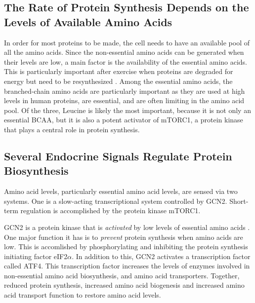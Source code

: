 \documentclass{tufte-handout}
\begin{document}
\subsection{The Rate of Protein Synthesis Depends on the Levels of Available Amino Acids}

In order for most proteins to be made, the cell needs to have an available pool of all the amino acids.  Since the non-essential amino acids can be generated when their levels are low, a main factor is the availability of the essential amino acids.  This is particularly important after exercise when proteins are degraded for energy but need to be resynthesized \citep{Tipton1999}.  Among the essential amino acids, the branched-chain amino acids are particularly important as they are used at high levels in human proteins, are essential, and are often limiting in the amino acid pool.  Of the three, Leucine is likely the most important, because it is not only an essential BCAA, but it is also a potent activator of mTORC1, a protein kinase that plays a central role in protein synthesis.

\subsection{Several Endocrine Signals Regulate Protein Biosynthesis}

Amino acid levels, particularly essential amino acid levels, are sensed via two systems.  One is a slow-acting transcriptional system controlled by GCN2.  Short-term regulation is accomplished by the protein kinase mTORC1.

  GCN2 is a protein kinase that is \emph{activated} by low levels of essential amino acids \citep{Castilho2014}.  One major function it has is to \emph{prevent} protein synthesis when amino acids are low.  This is accomlished by phosphorylating and inhibiting the protein synthesis initiating factor eIF2$\alpha$.  In addition to this, GCN2 activates a transcription factor called ATF4.  This transcription factor increases the levels of enzymes involved in non-essential amino acid biosynthesis, and amino acid transporters.  Together, reduced protein synthesis, increased amino acid biogenesis and increased amino acid transport function to restore amino acid levels.  
\end{document}
